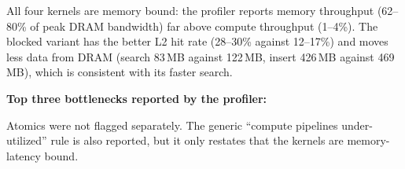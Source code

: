 \documentclass[11pt,a4paper]{article}
\begin{document}
\begin{table}[h]
\centering\small
\resizebox{\linewidth}{!}{}
\caption{Nsight Compute metrics. Arithmetic intensity is thread-level integer instructions per DRAM byte (the kernels execute no floating-point instructions). Warp efficiency is the average number of active threads per warp divided by 32.}
\label{tab:ncu}
\end{table}

All four kernels are memory bound: the profiler reports memory throughput (62--80\% of peak DRAM bandwidth) far above compute throughput (1--4\%).
The blocked variant has the better L2 hit rate (28--30\% against 12--17\%) and moves less data from DRAM (search 83\,MB against 122\,MB, insert 426\,MB against 469\,MB), which is consistent with its faster search.

\textbf{Top three bottlenecks reported by the profiler:}

\vspace{-0.5em}
Atomics were not flagged separately. The generic ``compute pipelines under-utilized'' rule is also reported, but it only restates that the kernels are memory-latency bound.
\end{document}
